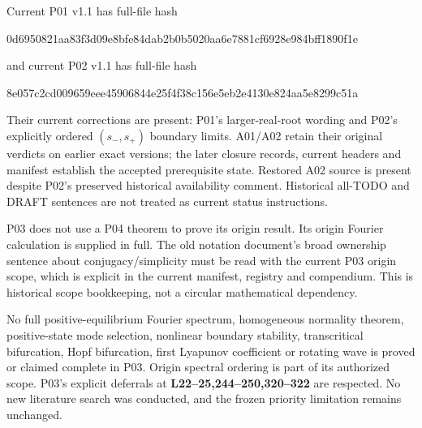 \documentclass[11pt]{article}
\newcommand{\lin}[1]{\textbf{L#1}}
\newcommand{\sha}[2]{\par{\small\ttfamily #1\allowbreak #2}\par}
\begin{document}
Current P01 v1.1 has full-file hash
\sha{0d6950821aa83f3d09e8bfe84dab2b0b}{5020aa6e7881cf6928e984bff1890f1e}
and current P02 v1.1 has full-file hash
\sha{8e057c2cd009659eee45906844e25f4f}{38c156e5eb2e4130e824aa5e8299c51a}
Their current corrections are present: P01's larger-real-root wording and
P02's explicitly ordered $(s_-,s_+)$ boundary limits. A01/A02 retain their
original verdicts on earlier exact versions; the later closure records,
current headers and manifest establish the accepted prerequisite state.
Restored A02 source is present despite P02's preserved historical availability
comment. Historical all-TODO and DRAFT sentences are not treated as current
status instructions.

P03 does not use a P04 theorem to prove its origin result. Its origin Fourier
calculation is supplied in full. The old notation document's broad ownership
sentence about conjugacy/simplicity must be read with the current P03 origin
scope, which is explicit in the current manifest, registry and compendium.
This is historical scope bookkeeping, not a circular mathematical dependency.

No full positive-equilibrium Fourier spectrum, homogeneous normality theorem,
positive-state mode selection, nonlinear boundary stability, transcritical
bifurcation, Hopf bifurcation, first Lyapunov coefficient or rotating wave is
proved or claimed complete in P03. Origin spectral ordering is part of its
authorized scope. P03's explicit deferrals at \lin{22--25,244--250,320--322}
are respected. No new literature search was conducted, and the frozen
priority limitation remains unchanged.
\end{document}
